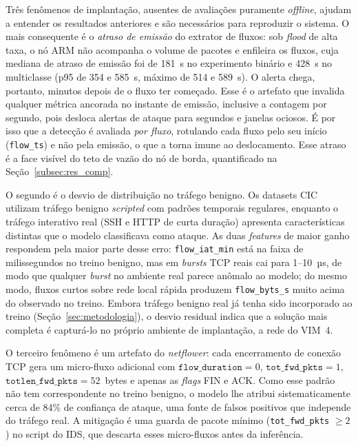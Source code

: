 \documentclass[12pt]{article}
\begin{document}
Três fenômenos de implantação, ausentes de avaliações puramente \textit{offline},
ajudam a entender os resultados anteriores e são necessários para reproduzir o
sistema. O mais consequente é o \emph{atraso de emissão} do extrator de fluxos:
sob \textit{flood} de alta taxa, o nó ARM não acompanha o volume de pacotes e
enfileira os fluxos, cuja mediana de atraso de emissão foi de 181~s no experimento
binário e 428~s no multiclasse (p95 de 354 e 585~s, máximo de 514 e 589~s). O
alerta chega, portanto, minutos depois de o fluxo ter começado. Esse é o artefato
que invalida qualquer métrica ancorada no instante de emissão, inclusive a
contagem por segundo, pois desloca alertas de ataque para segundos e janelas
ociosos. É por isso que a detecção é avaliada \emph{por fluxo}, rotulando cada
fluxo pelo seu início (\texttt{flow\_ts}) e não pela emissão, o que a torna imune
ao deslocamento. Esse atraso é a face visível do teto de vazão do nó de borda,
quantificado na Seção~\ref{subsec:res_comp}.

O segundo é o desvio de distribuição no tráfego benigno. Os datasets
CIC utilizam tráfego benigno \textit{scripted} com padrões temporais regulares,
enquanto o tráfego interativo real (SSH e HTTP de curta duração) apresenta
características distintas que o modelo classificava como ataque. As duas
\textit{features} de maior ganho respondem pela maior parte desse erro:
\texttt{flow\_iat\_min} está na faixa de milissegundos no treino benigno, mas em
\textit{bursts} TCP reais cai para 1--10~µs, de modo que qualquer \textit{burst}
no ambiente real parece anômalo ao modelo; do mesmo modo, fluxos curtos sobre
rede local rápida produzem \texttt{flow\_byts\_s} muito acima do observado no
treino. Embora tráfego benigno real já tenha sido incorporado ao treino
(Seção~\ref{sec:metodologia}), o desvio residual indica que a solução mais
completa é capturá-lo no próprio ambiente de implantação, a rede do VIM~4.

O terceiro fenômeno é um artefato do \textit{netflower}: cada encerramento de
conexão TCP gera um micro-fluxo adicional com $\texttt{flow\_duration} = 0$,
$\texttt{tot\_fwd\_pkts} = 1$, $\texttt{totlen\_fwd\_pkts} = 52$~bytes e apenas
as \textit{flags} FIN e ACK. Como esse padrão não tem correspondente no treino
benigno, o modelo lhe atribui sistematicamente cerca de 84\% de confiança de
ataque, uma fonte de falsos positivos que independe do tráfego real. A mitigação
é uma guarda de pacote mínimo (\texttt{tot\_fwd\_pkts} $\geq 2$) no script do
IDS, que descarta esses micro-fluxos antes da inferência.
\end{document}
